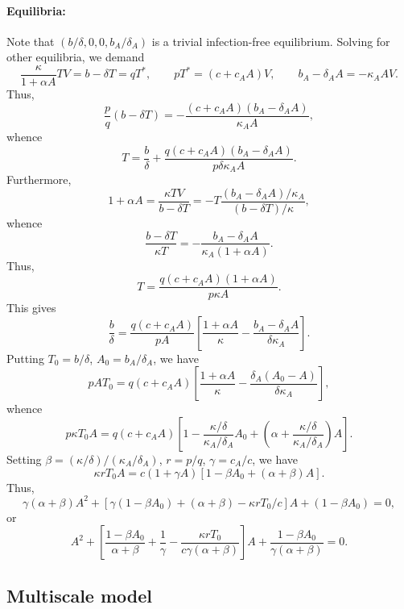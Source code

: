 \documentclass[11pt]{article}
\begin{document}
    \paragraph{Equilibria:} Note that $(b / \delta, 0, 0, b_A / \delta_A)$ is
    a trivial infection-free equilibrium. Solving for other equilibria, we
    demand \[
        \frac{\kappa}{1 + \alpha A} TV = b - \delta T = q T^*, \qquad
        pT^* = (c + c_A A)V, \qquad
        b_A - \delta_AA = -\kappa_A AV.
    \] Thus, \[
        \frac{p}{q}(b - \delta T) = -\frac{(c + c_A A)(b_A - \delta_A A)}{\kappa_A A},
    \] whence \[
        T = \frac{b}{\delta} + \frac{q(c + c_A A)(b_A - \delta_A A)}{p \delta \kappa_A A}.
    \] Furthermore, \[
        1 + \alpha A = \frac{\kappa TV}{b - \delta T} = -T \frac{(b_A - \delta_A A) / \kappa_A}{(b - \delta T) / \kappa},
    \] whence \[
        \frac{b - \delta T}{\kappa T} = - \frac{b_A - \delta_A A}{\kappa_A (1 + \alpha A)}.
    \] Thus, \[
        T  = \frac{q(c + c_A A)(1 + \alpha A)}{p\kappa A}.
    \] This gives \[
        \frac{b}{\delta} = \frac{q(c + c_A A)}{pA}\left[\frac{1 + \alpha A}{\kappa} - \frac{b_A - \delta_A A}{\delta \kappa_A}\right].
    \] Putting $T_0 = b / \delta$, $A_0 = b_A / \delta_A$, we have \[
        pAT_0 = q(c + c_A A)\left[\frac{1 + \alpha A}{\kappa} - \frac{\delta_A(A_0 - A)}{\delta \kappa_A}\right],
    \] whence \[
        p\kappa T_0 A
        = q(c + c_A A)\left[1 - \frac{\kappa/\delta}{\kappa_A/\delta_A}A_0 + \left(\alpha + \frac{\kappa / \delta}{\kappa_A / \delta_A}\right)A\right].
    \] Setting $\beta = (\kappa / \delta) / (\kappa_A / \delta_A)$, $r = p /
    q$, $\gamma = c_A / c$, we have \[
        \kappa r T_0 A = c(1 + \gamma A)[1 - \beta A_0 + (\alpha + \beta)A].
    \] Thus, \[
        \gamma(\alpha + \beta)A^2 + [\gamma(1 - \beta A_0) + (\alpha + \beta) - \kappa r T_0 / c] A + (1 - \beta A_0) = 0,
    \] or \[
        A^2 + \left[\frac{1 - \beta A_0}{\alpha + \beta} + \frac{1}{\gamma} - \frac{\kappa r T_0}{c\gamma(\alpha + \beta)}\right] A + \frac{1 - \beta A_0}{\gamma(\alpha + \beta)} = 0.
    \]


    \subsection{Multiscale model}
\end{document}
